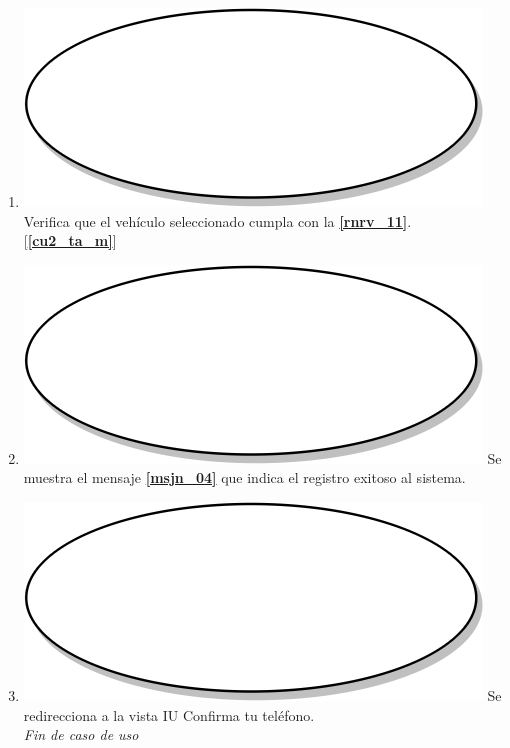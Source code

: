 \begin{enumerate}
  \item {\includegraphics[scale=.05]{Capitulo3/img/proceso.png} Verifica que el vehículo seleccionado cumpla con la \textbf{\ref{rnrv_11}}. [\textbf{\ref{cu2_ta_m}}]}
  \item {\includegraphics[scale=.05]{Capitulo3/img/proceso.png} Se muestra el mensaje \textbf{\ref{msjn_04}} que indica el registro exitoso al sistema.}
  \item {\includegraphics[scale=.1]{Capitulo3/img/proceso.png} Se redirecciona a la vista IU Confirma tu teléfono.}\\
  \textit{Fin de caso de uso} \\	
\end{enumerate}

